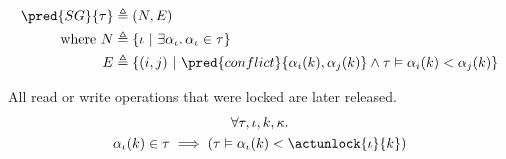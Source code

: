 \begin{align*}
\pred{SG}{\tau} &\triangleq (N, E) \\
\text{where } N &\triangleq \{ \iota\ |\ \exists \alpha_\iota \ldotp \alpha_\iota \in \tau \} \\
E &\triangleq \{ (i, j)\ |\ \pred{conflict}{\alpha_i(k), \alpha_j(k)} \land \tau \vDash \alpha_i(k) < \alpha_j(k) \}
\end{align*}

\lem \label{lem:unlock} All read or write operations that were locked are later released.
\begin{gather*}
\forall \tau, \iota, k, \kappa \ldotp \\
\alpha_\iota(k) \in \tau \implies \left( \tau \vDash \alpha_\iota(k) < \actunlock{\iota}{k} \right)
\end{gather*}

